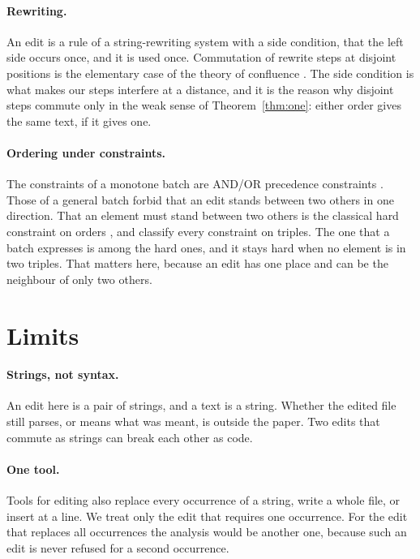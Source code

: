 \documentclass[acmsmall,nonacm,screen]{acmart}
\begin{document}
\paragraph{Rewriting.} An edit is a rule of a string-rewriting system \citep{BookOtto1993}
with a side condition, that the left side occurs once, and it is used once. Commutation of
rewrite steps at disjoint positions is the elementary case of the theory of confluence
\citep{Huet1980}. The side condition is what makes our steps interfere at a distance, and it
is the reason why disjoint steps commute only in the weak sense of Theorem~\ref{thm:one}:
either order gives the same text, if it gives one.

\paragraph{Ordering under constraints.} The constraints of a monotone batch are AND/OR
precedence constraints \citep{Mohring2004}. Those of a general batch forbid that an edit
stands between two others in one direction. That an element must stand between two others is
the classical hard constraint on orders \citep{Opatrny1979}, and \citet{Guttmann2006}
classify every constraint on triples. The one that a batch expresses is among the hard ones,
and it stays hard when no element is in two triples. That matters here, because an edit has
one place and can be the neighbour of only two others.

\section{Limits}\label{sec:limits}

\paragraph{Strings, not syntax.} An edit here is a pair of strings, and a text is a string.
Whether the edited file still parses, or means what was meant, is outside the paper. Two
edits that commute as strings can break each other as code.

\paragraph{One tool.} Tools for editing also replace every occurrence of a string, write a
whole file, or insert at a line. We treat only the edit that requires one occurrence. For
the edit that replaces all occurrences the analysis would be another one, because such an
edit is never refused for a second occurrence.
\end{document}
